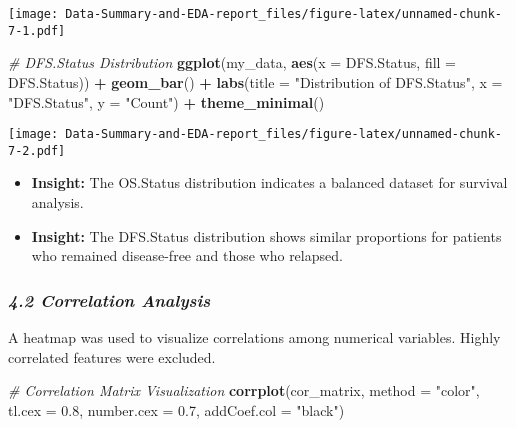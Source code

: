 \documentclass[
]{article}
\newenvironment{Shaded}{\begin{snugshade}}{\end{snugshade}}
\newcommand{\AttributeTok}[1]{\textcolor[rgb]{0.13,0.29,0.53}{#1}}
\newcommand{\CommentTok}[1]{\textcolor[rgb]{0.56,0.35,0.01}{\textit{#1}}}
\newcommand{\FloatTok}[1]{\textcolor[rgb]{0.00,0.00,0.81}{#1}}
\newcommand{\FunctionTok}[1]{\textcolor[rgb]{0.13,0.29,0.53}{\textbf{#1}}}
\newcommand{\NormalTok}[1]{#1}
\newcommand{\SpecialCharTok}[1]{\textcolor[rgb]{0.81,0.36,0.00}{\textbf{#1}}}
\newcommand{\StringTok}[1]{\textcolor[rgb]{0.31,0.60,0.02}{#1}}
\begin{document}
\texttt{[image: Data-Summary-and-EDA-report\_files/figure-latex/unnamed-chunk-7-1.pdf]}

\begin{Shaded}
\begin{Highlighting}[]
\CommentTok{\# DFS.Status Distribution}
\FunctionTok{ggplot}\NormalTok{(my\_data, }\FunctionTok{aes}\NormalTok{(}\AttributeTok{x =}\NormalTok{ DFS.Status, }\AttributeTok{fill =}\NormalTok{ DFS.Status)) }\SpecialCharTok{+}
  \FunctionTok{geom\_bar}\NormalTok{() }\SpecialCharTok{+}
  \FunctionTok{labs}\NormalTok{(}\AttributeTok{title =} \StringTok{"Distribution of DFS.Status"}\NormalTok{, }\AttributeTok{x =} \StringTok{"DFS.Status"}\NormalTok{, }\AttributeTok{y =} \StringTok{"Count"}\NormalTok{) }\SpecialCharTok{+}
  \FunctionTok{theme\_minimal}\NormalTok{()}
\end{Highlighting}
\end{Shaded}

\texttt{[image: Data-Summary-and-EDA-report\_files/figure-latex/unnamed-chunk-7-2.pdf]}

\begin{itemize}
\item
  \textbf{Insight:} The OS.Status distribution indicates a balanced
  dataset for survival analysis.
\item
  \textbf{Insight:} The DFS.Status distribution shows similar
  proportions for patients who remained disease-free and those who
  relapsed.
\end{itemize}

\subsubsection{\texorpdfstring{\emph{4.2 Correlation
Analysis}}{4.2 Correlation Analysis}}\label{correlation-analysis}

A heatmap was used to visualize correlations among numerical variables.
Highly correlated features were excluded.

\begin{Shaded}
\begin{Highlighting}[]
\CommentTok{\# Correlation Matrix Visualization}
\FunctionTok{corrplot}\NormalTok{(cor\_matrix, }\AttributeTok{method =} \StringTok{"color"}\NormalTok{, }\AttributeTok{tl.cex =} \FloatTok{0.8}\NormalTok{, }\AttributeTok{number.cex =} \FloatTok{0.7}\NormalTok{, }\AttributeTok{addCoef.col =} \StringTok{"black"}\NormalTok{)}
\end{Highlighting}
\end{Shaded}
\end{document}
